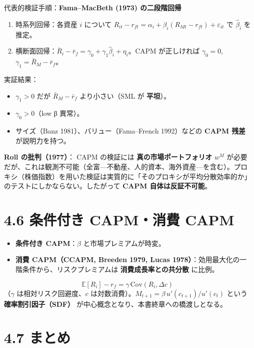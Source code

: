 \documentclass[11pt,a4paper]{report}
\begin{document}
代表的検証手順：\textbf{Fama–MacBeth (1973) の二段階回帰}

\begin{enumerate}
\item 時系列回帰：各資産 $i$ について $R_{it} - r_{ft} = \alpha_i + \beta_i (R_{Mt} - r_{ft}) + \varepsilon_{it}$ で $\hat\beta_i$ を推定。
\item 横断面回帰：$\bar R_i - \bar r_f = \gamma_0 + \gamma_1 \hat\beta_i + \eta_i$。CAPM が正しければ $\gamma_0 = 0$, $\gamma_1 = \bar R_M - \bar r_f$。
\end{enumerate}

実証結果：
\begin{itemize}
\item $\gamma_1 > 0$ だが $\bar R_M - \bar r_f$ より小さい（SML が \textbf{平坦}）。
\item $\gamma_0 > 0$（low β 異常）。
\item サイズ（Banz 1981）、バリュー（Fama–French 1992）などの \textbf{CAPM 残差} が説明力を持つ。
\end{itemize}

\textbf{Roll の批判（1977）}： CAPM の検証には \textbf{真の市場ポートフォリオ} $w^M$ が必要だが、これは観測不可能（全富—不動産、人的資本、海外資産—を含む）。プロキシ（株価指数）を用いた検証は実質的に「そのプロキシが平均分散効率的か」のテストにしかならない。したがって \textbf{CAPM 自体は反証不可能}。

\section{4.6 条件付き CAPM・消費 CAPM}

\begin{itemize}
\item \textbf{条件付き CAPM}：$\beta$ と市場プレミアムが時変。
\item \textbf{消費 CAPM（CCAPM, Breeden 1979, Lucas 1978）}：効用最大化の一階条件から、リスクプレミアムは \textbf{消費成長率との共分散} に比例。
\end{itemize}
\[ \mathbb{E}[R_i] - r_f = \gamma\, \mathrm{Cov}(R_i, \Delta c) \] （$\gamma$ は相対リスク回避度、$c$ は対数消費）。$M_{t+1} = \beta\, u'(c_{t+1})/u'(c_t)$ という \textbf{確率割引因子（SDF）} が中心概念となり、本書終章への橋渡しとなる。

\section{4.7 まとめ}
\end{document}
